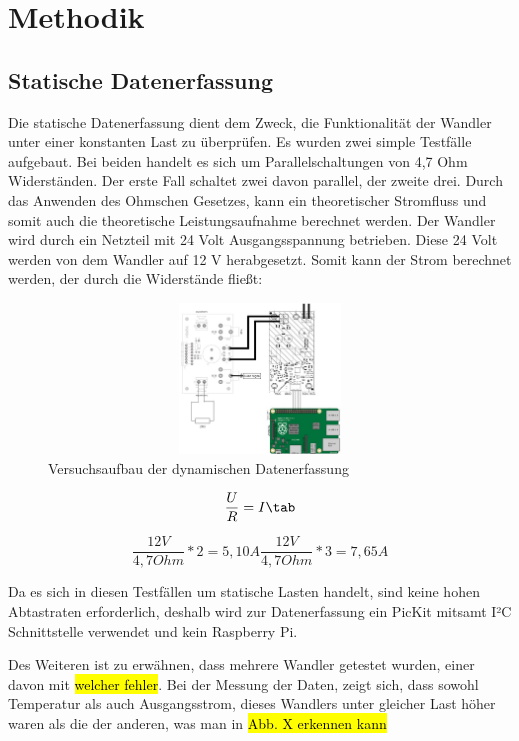\section{Methodik}
\subsection{Statische Datenerfassung}

\begin{flushleft}
Die statische Datenerfassung dient dem Zweck, die Funktionalität der Wandler unter einer konstanten Last zu überprüfen. Es wurden zwei simple Testfälle aufgebaut. Bei beiden handelt es sich um Parallelschaltungen von 4,7 Ohm Widerständen. Der erste Fall schaltet zwei davon parallel, der zweite drei. Durch das Anwenden des Ohmschen Gesetzes, kann ein theoretischer Stromfluss und somit auch die theoretische Leistungsaufnahme berechnet werden. Der Wandler wird durch ein Netzteil mit 24 Volt Ausgangsspannung betrieben. Diese 24 Volt werden von dem Wandler auf 12 V herabgesetzt. 
Somit kann der Strom berechnet werden, der durch die Widerstände fließt:
\end{flushleft}



\begin{figure}
    \centering
    \includegraphics[height= 4cm, width = 12cm]{Pictures/Dyn_Schaltung.jpg}
    \caption{Versuchsaufbau der dynamischen Datenerfassung}
\end{figure}


\begin{equation}
\label{Ohmsches Gesetz}
\frac{U}{R} = I \tab
\end{equation}


\begin{equation}
\label{Ohmsches Gesetz}
\frac{12V}{4,7 Ohm}*2 = 5,10 A 
\frac{12V}{4,7 Ohm}*3 = 7,65 A
\end{equation}

\begin{flushleft}
Da es sich in diesen Testfällen um statische Lasten handelt, sind keine hohen Abtastraten erforderlich, deshalb wird zur Datenerfassung ein PicKit mitsamt I²C Schnittstelle verwendet und kein Raspberry Pi. 

Des Weiteren ist zu erwähnen, dass mehrere Wandler getestet wurden, einer davon mit \hl{welcher fehler}. Bei der Messung der Daten, zeigt sich, dass sowohl Temperatur als auch Ausgangsstrom, dieses Wandlers unter gleicher Last höher waren als die der anderen, was man in \hl{Abb. X erkennen kann} 
\end{flushleft}

